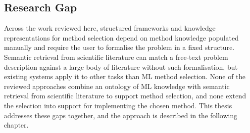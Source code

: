 \subsection{Research Gap}
\label{sec:research-gap}

Across the work reviewed here, structured frameworks and 
knowledge representations for method selection depend on 
method knowledge populated manually and require the user to 
formalise the problem in a fixed structure. Semantic retrieval from 
scientific literature can match a free-text problem 
description against a large body of literature without such 
formalisation, but existing systems apply it to other tasks 
than ML method selection. None of the reviewed approaches 
combine an ontology of ML knowledge with semantic retrieval from 
scientific literature to support method selection, and none 
extend the selection into support for implementing the chosen 
method. This thesis addresses these gaps together, and the 
approach is described in the following chapter.
